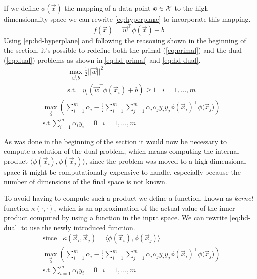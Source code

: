 If we define $\phi(\vec{x})$ the mapping of a data-point $\boldsymbol{x} \in \mathcal{X}$ to the high
dimensionality space we can rewrite \cref{eq:hyperplane} to incorporate this mapping.
\begin{equation}
	\label{ep:hd-hyperplane}
	f(\vec{x}) = \vec{w}^\top \phi(\vec{x}) + b
\end{equation}
Using \cref{ep:hd-hyperplane} and following the reasoning shown in the beginning of the section,
it's possible to redefine both the primal (\cref{eq:primal}) and the dual (\cref{eq:dual}) problems
as shown in \cref{eq:hd-primal} and \cref{eq:hd-dual}.
\begin{equation}
	\label{eq:hd-primal}
	\begin{aligned}
		 & \max_{\vec{w}, b}\frac{1}{2}||\vec{w}||^2                                                   \\
		 & \text{s.t.}\hspace{10pt}y_i(\vec{w}^\top\phi(\vec{x}_i) + b) \geq 1 \hspace{10pt}i = 1, \ldots, m
	\end{aligned}
\end{equation}
\begin{equation}
	\label{eq:hd-dual}
	\begin{aligned}
		 & \max_{\vec{\alpha}}\left(\sum_{i = 1}^{m}{\alpha_i} - \frac{1}{2}\sum_{i =
		1}^{m}\sum_{j = 1}^{m}{\alpha_i\alpha_j y_i y_j \phi(\vec{x}_i)^\top\phi(\vec{x}_j})\right)       \\
		 & \text{s.t.} \sum_{i = 1}^{m}{\alpha_i y_i} = 0 \hspace{10pt} i = 1, \ldots, m
	\end{aligned}
\end{equation}

As was done in the beginning of the section it would now be necessary to compute a solution of the
dual problem, which means computing the internal product $\langle\phi(\vec{x}_i),
\phi(\vec{x}_j)\rangle$, since the problem was moved to a high dimensional space it might be
computationally expensive to handle, especially because the number of dimensions of the final space
is not known.

To avoid having to compute such a product we define a function, known as \emph{kernel} function
$\kappa(\cdot, \cdot)$,
which is an approximation of the actual value of the inner product computed by using a function in
the input space. We can rewrite \cref{eq:hd-dual} to use the newly introduced function.
\begin{equation}
	\label{eq:hd-dual-kf}
	\begin{aligned}
		&\text{since} \hspace{10pt} \kappa(\vec{x}_i, \vec{x}_j) = \langle\phi(\vec{x}_i),
\phi(\vec{x}_j)\rangle \\
		 & \max_{\vec{\alpha}}\left(\sum_{i = 1}^{m}{\alpha_i} - \frac{1}{2}\sum_{i =
		1}^{m}\sum_{j = 1}^{m}{\alpha_i\alpha_j y_i y_j \phi(\vec{x}_i)^\top\phi(\vec{x}_j})\right)       \\
		 & \text{s.t.} \sum_{i = 1}^{m}{\alpha_i y_i} = 0 \hspace{10pt} i = 1, \ldots, m
	\end{aligned}
\end{equation}


